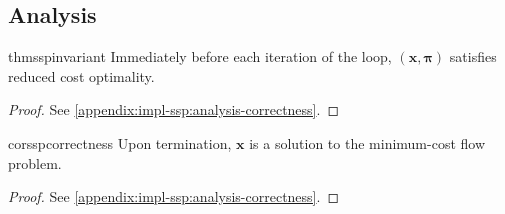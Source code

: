\subsection{Analysis} \label{sec:impl-ssp-analysis}

\begin{restatable}{thm}{sspinvariant} \label{thm:ssp-invariant}
    Immediately before each iteration of the loop, $(\mathbf{x},\boldsymbol{\pi})$ satisfies reduced cost optimality.
\end{restatable}
\begin{proof}
See \cref{appendix:impl-ssp:analysis-correctness}.
\end{proof}
\begin{restatable}{cor}{sspcorrectness} \label{cor:ssp-correctness}
    Upon termination, $\mathbf{x}$ is a solution to the minimum-cost flow problem.
\end{restatable}
\begin{proof}
See \cref{appendix:impl-ssp:analysis-correctness}.
\end{proof}

